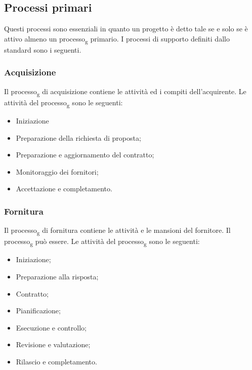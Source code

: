 \subsection{Processi primari}
Questi processi sono essenziali in quanto un progetto è detto tale se e solo se è attivo almeno un processo\textsubscript{g} primario.
I processi di supporto definiti dallo standard sono i seguenti.
\subsubsection{Acquisizione}
Il processo\textsubscript{g} di acquisizione contiene le attività ed i compiti dell'acquirente.
Le attività del processo\textsubscript{g} sono le seguenti:
\begin{itemize}
\item Iniziazione
\item Preparazione della richiesta di proposta;
\item Preparazione e aggiornamento del contratto;
\item Monitoraggio dei fornitori;
\item Accettazione e completamento.
\end{itemize}

\subsubsection{Fornitura}
Il processo\textsubscript{g} di fornitura contiene le attività e le mansioni del fornitore. Il processo\textsubscript{g} può essere.
Le attività del processo\textsubscript{g} sono le seguenti:
\begin{itemize}
\item Iniziazione;
\item Preparazione alla risposta;
\item Contratto;
\item Pianificazione;
\item Esecuzione e controllo;
\item Revisione e valutazione;
\item Rilascio e completamento.
\end{itemize}

